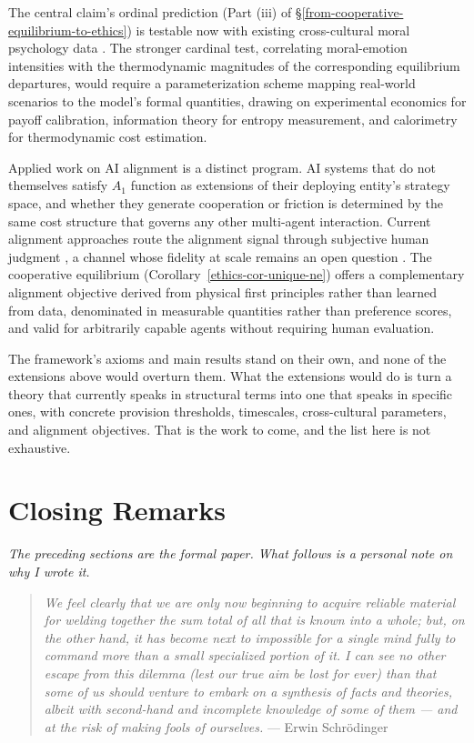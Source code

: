 \documentclass[11pt]{article}
\theoremstyle{plain}
\theoremstyle{definition}
\theoremstyle{remark}
\newcounter{none}
\let\origsection\section
\renewcommand{\section}{\needspace{12\baselineskip}\origsection}
\begin{document}
The central claim's ordinal prediction (Part (iii) of
§\ref{from-cooperative-equilibrium-to-ethics}) is testable now with
existing cross-cultural moral psychology data
\citep{Haidt2003, Curry2019}. The stronger cardinal test, correlating
moral-emotion intensities with the thermodynamic magnitudes of the
corresponding equilibrium departures, would require a parameterization
scheme mapping real-world scenarios to the model's formal quantities,
drawing on experimental economics for payoff calibration, information
theory for entropy measurement, and calorimetry for thermodynamic cost
estimation.

Applied work on AI alignment is a distinct program. AI systems that do
not themselves satisfy \(A_1\) function as extensions of their deploying
entity's strategy space, and whether they generate cooperation or
friction is determined by the same cost structure that governs any other
multi-agent interaction. Current alignment approaches route the
alignment signal through subjective human judgment
\citep{Christiano2017, Ouyang2022}, a channel whose fidelity at scale
remains an open question \citep{Bowman2022, Casper2023}. The cooperative
equilibrium (Corollary~\ref{ethics-cor-unique-ne}) offers a
complementary alignment objective derived from physical first principles
rather than learned from data, denominated in measurable quantities
rather than preference scores, and valid for arbitrarily capable agents
without requiring human evaluation.

The framework's axioms and main results stand on their own, and none of
the extensions above would overturn them. What the extensions would do
is turn a theory that currently speaks in structural terms into one that
speaks in specific ones, with concrete provision thresholds, timescales,
cross-cultural parameters, and alignment objectives. That is the work to
come, and the list here is not exhaustive.

\section{Closing Remarks}\label{closing-remarks}

\emph{The preceding sections are the formal paper. What follows is a
personal note on why I wrote it.}

\begin{quote}
\emph{We feel clearly that we are only now beginning to acquire reliable
material for welding together the sum total of all that is known into a
whole; but, on the other hand, it has become next to impossible for a
single mind fully to command more than a small specialized portion of
it. I can see no other escape from this dilemma (lest our true aim be
lost for ever) than that some of us should venture to embark on a
synthesis of facts and theories, albeit with second-hand and incomplete
knowledge of some of them --- and at the risk of making fools of
ourselves.} --- Erwin Schrödinger \citep{Schrodinger1944}
\end{quote}
\end{document}
